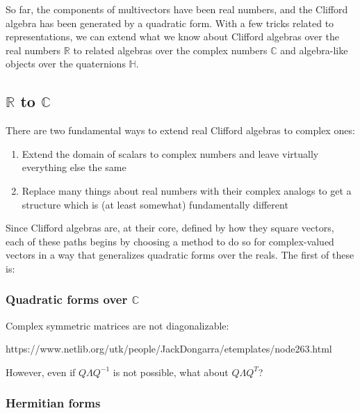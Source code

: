 \documentclass{article}
\begin{document}
So far, the components of multivectors have been real numbers,
and the Clifford algebra has been generated by a quadratic form.
With a few tricks related to representations, we can extend what we know
about Clifford algebras over the real numbers $\mathbb{R}$
to related algebras over the complex numbers $\mathbb{C}$
and algebra-like objects over the quaternions $\mathbb{H}$.

\subsection{\texorpdfstring{$\mathbb{R}$}{R} to \texorpdfstring{$\mathbb{C}$}{C}}

There are two fundamental ways to extend real Clifford algebras to complex ones:
\begin{enumerate}
  \item
    Extend the domain of scalars to complex numbers
    and leave virtually everything else the same
  \item
    Replace many things about real numbers with their complex analogs
    to get a structure which is (at least somewhat) fundamentally different
\end{enumerate}

Since Clifford algebras are, at their core, defined by how they square vectors,
each of these paths begins by choosing a method to do so for complex-valued vectors
in a way that generalizes quadratic forms over the reals.
The first of these is:

\subsubsection{Quadratic forms over \texorpdfstring{$\mathbb{C}$}{C}}

Complex symmetric matrices are not diagonalizable:

https://www.netlib.org/utk/people/JackDongarra/etemplates/node263.html

However, even if $Q \Lambda Q^{-1}$ is not possible,
what about $Q \Lambda Q^T$?

\subsubsection{Hermitian forms}
\end{document}

